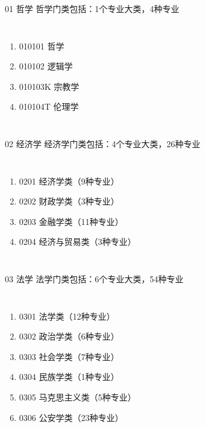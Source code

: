 \documentclass[aspectratio=169]{ctexbeamer} %
\begin{document}
\begin{frame}[t]{01 哲学}
哲学门类包括：1个专业大类，4种专业
\begin{spacing}{1.5} %
\begin{columns}
{\large
\begin{enumerate}[label={\arabic*.}]
\item 010101 哲学
\item 010102 逻辑学
\item 010103K 宗教学
\item 010104T 伦理学
\end{enumerate} 
}
\end{columns}
\end{spacing}
\end{frame}

\begin{frame}[t]{02 经济学}
经济学门类包括：4个专业大类，26种专业
\begin{spacing}{1.5} %
\begin{columns}
{\large
\begin{enumerate}[label={\arabic*.}]
\item 0201 经济学类（9种专业）
\item 0202 财政学类（3种专业）
\item 0203 金融学类（11种专业）
\item 0204 经济与贸易类（3种专业）
\end{enumerate} 
}
\end{columns}
\end{spacing}
\end{frame}

\begin{frame}[t]{03 法学}
法学门类包括：6个专业大类，54种专业
\begin{spacing}{1.5} %
\begin{columns}
{\large
\begin{enumerate}[label={\arabic*.}]
\item 0301 法学类（12种专业）
\item 0302 政治学类（6种专业）
\item 0303 社会学类（7种专业）
\item 0304 民族学类（1种专业）
\item 0305 马克思主义类（5种专业）
\item 0306 公安学类（23种专业）
\end{enumerate} 
}
\end{columns}
\end{spacing}
\end{frame}
\end{document}
